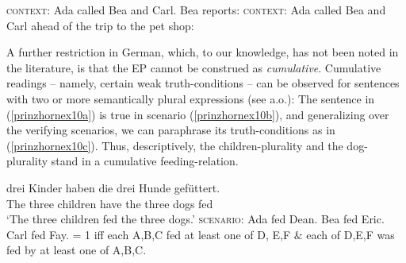 \documentclass[output=paper]{langscibook}
\begin{document}
\ea \label{prinzhornex8} \textsc{context:} Ada called Bea and Carl. Bea reports:
\z 
\ex \label{prinzhornex9} \textsc{context:} Ada called Bea and Carl ahead of the trip to the pet shop:
\z \z

A further restriction in German, which, to our knowledge, has not been noted in the literature, is that the EP cannot be construed as \textit{cumulative}. Cumulative readings -- namely, certain weak truth-conditions -- can be observed for sentences with two or more semantically plural expressions (see \citealt{Langendoen:1978} a.o.): The sentence in (\ref{prinzhornex10a}) is true in  scenario (\ref{prinzhornex10b}), and generalizing over the verifying scenarios, we can paraphrase its truth-conditions as in (\ref{prinzhornex10c}). Thus, descriptively, the children-plurality and the dog-plurality stand in a cumulative feeding-relation.

\ea \label{prinzhornmyex}
\ea {} {drei}  {Kinder} {haben} {die} {drei} {Hunde} {gefüttert}.\\
    The three children have the three dogs fed \\
\glt `The three children fed the three dogs.' \label{prinzhornex10a}
\ex   \textsc{scenario}: Ada fed Dean. Bea fed Eric. Carl fed Fay.  \label{prinzhornex10b}
\ex \sem{}{(\ref{prinzhornex10a})} = 1 iff each A,B,C fed at least one of  D, E,F $\&$ each of D,E,F was fed by at least one of A,B,C.\label{prinzhornex10c}
\z \z
\end{document}
